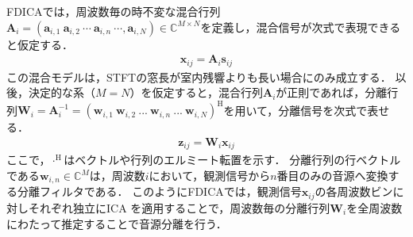 FDICAでは，周波数毎の時不変な混合行列 $\bm{A}_{i} = (\bm{a}_{i, 1} ~\bm{a}_{i, 2} ~\cdots ~\bm{a}_{i, n}~\cdots,\bm{a}_{i, N} )\in \mathbb{C}^{M\times N}$を定義し，混合信号が次式で表現できると仮定する．
\begin{align}
 \bm{x}_{ij} = \bm{A}_i\bm{s}_{ij}
\end{align}
この混合モデルは，STFTの窓長が室内残響よりも長い場合にのみ成立する．
以後，決定的な系（$M=N$）を仮定すると，混合行列$\bm{A}_{i}$が正則であれば，分離行列$\bm{W}_i=\bm{A}_i^{-1}=(\bm{w}_{i,1}~\bm{w}_{i,2}~ ...~ \bm{w}_{i, n}~ ... ~\bm{w}_{i, N})^{\mathrm{H}}$を用いて，分離信号を次式で表せる．
\begin{align}
 \bm{z}_{ij} = \bm{W}_{i}\bm{x}_{ij} \label{eq:sep}
\end{align}
ここで，$\cdot^\mathrm{H}$はベクトルや行列のエルミート転置を示す．
分離行列の行ベクトルである$\bm{w}_{i,n}\in\mathbb{C}^M$は，周波数$i$において，観測信号から$n$番目のみの音源へ変換する分離フィルタである．
このようにFDICAでは，観測信号$\bm{x}_{ij}$の各周波数ビンに対しそれぞれ独立にICA を適用することで，周波数毎の分離行列$\bm{W}_{i}$を全周波数にわたって推定することで音源分離を行う．

